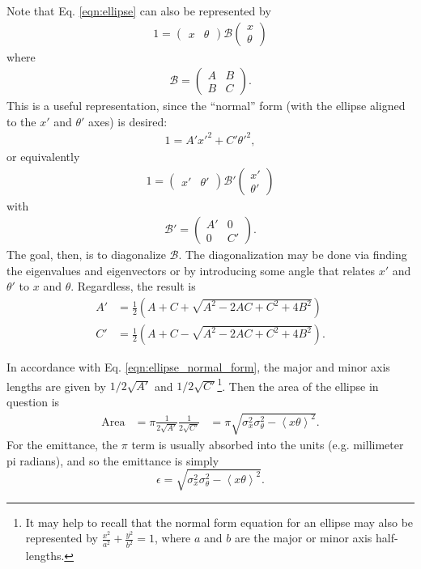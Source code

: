 Note that Eq. \eqref{eqn:ellipse} can also be represented by
\begin{align*}
1=\begin{pmatrix} x & \theta \end{pmatrix}	\mathcal{B} 	\begin{pmatrix} x\\ \theta \end{pmatrix}
\end{align*}
where
\begin{align*}
\mathcal{B}=
	\begin{pmatrix}
	A & B\\
	B & C
	\end{pmatrix}.
\end{align*}
This is a useful representation, since the ``normal'' form (with the ellipse aligned to the $x'$ and $\theta '$ axes) is desired:
\begin{align} \label{eqn:ellipse_normal_form}
1 = A'x'^2 + C'\theta '^2,
\end{align}
or equivalently
\begin{align*}
1 = \begin{pmatrix} x' & \theta ' \end{pmatrix}	\mathcal{B'} 	\begin{pmatrix} x'\\ \theta ' \end{pmatrix}
\end{align*}
with
\begin{align*}
\mathcal{B}'=\begin{pmatrix} A' & 0 \\ 0 & C' \end{pmatrix}.
\end{align*}
The goal, then, is to diagonalize $\mathcal{B}$. The diagonalization may be done via finding the eigenvalues and eigenvectors or by introducing some angle that relates $x'$ and $\theta '$ to $x$ and $\theta$. Regardless, the result is
\begin{align*}
A'&=\frac{1}{2}\left(A+C+\sqrt{A^2-2AC+C^2+4B^2}\right)\\
C'&=\frac{1}{2}\left(A+C-\sqrt{A^2-2AC+C^2+4B^2}\right).
\end{align*}

In accordance with Eq. \eqref{eqn:ellipse_normal_form}, the major and minor axis lengths are given by $1/2\sqrt{A'}$ and $1/2\sqrt{C'}$\footnote{It may help to recall that the normal form equation for an ellipse may also be represented by $\frac{x^2}{a^2}+\frac{y^2}{b^2}=1$, where $a$ and $b$ are the major or minor axis half-lengths.}. Then the area of the ellipse in question is
\begin{align*}
\text{Area}&=\pi\frac{1}{2\sqrt{A'}}\frac{1}{2\sqrt{C'}}
&=\pi\sqrt{\sigma_x^2\sigma_\theta^2 - \left<x\theta\right>^2}.
\end{align*}
For the emittance, the $\pi$ term is usually absorbed into the units (e.g. millimeter pi radians), and so the emittance is simply
\begin{equation}\label{emittance_appendix}
\epsilon=\sqrt{\sigma_x^2\sigma_\theta^2 - \left<x\theta\right>^2}.
\end{equation}

